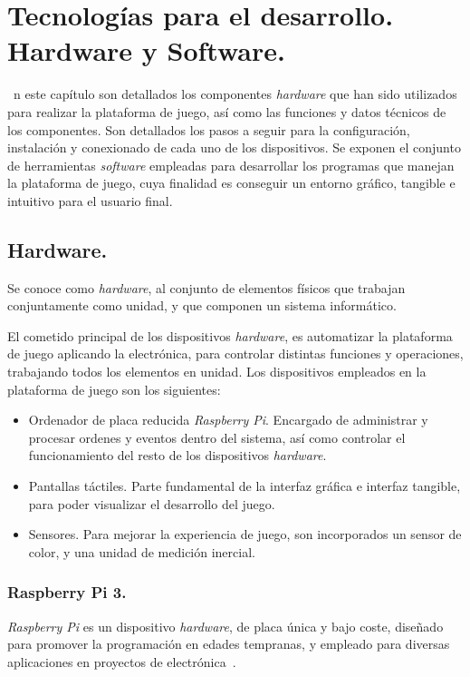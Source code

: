 \chapter{Tecnologías para el desarrollo. Hardware y Software.}
\label{chap:tecnologias}

\noindent
{}~n este capítulo son detallados los componentes \emph{hardware} que han sido utilizados para realizar la plataforma de juego, así como las funciones y datos técnicos de los componentes. Son detallados los pasos a seguir para la configuración, instalación y conexionado de cada uno de los dispositivos. Se exponen el conjunto de herramientas \emph{software} empleadas para desarrollar los programas que manejan la plataforma de juego, cuya finalidad es conseguir un entorno gráfico, tangible e intuitivo para el usuario final.


\section{Hardware.}
\label{sec:hardware}
Se conoce como \emph{hardware}, al conjunto de elementos físicos que trabajan conjuntamente como unidad, y que componen un sistema informático.

El cometido principal de los dispositivos \emph{hardware}, es automatizar la plataforma de juego aplicando la electrónica, para controlar distintas funciones y operaciones, trabajando todos los elementos en unidad.
Los dispositivos empleados en la plataforma de juego son los siguientes:
\begin{itemize}
\item Ordenador de placa reducida \emph{Raspberry Pi}. Encargado de administrar y procesar ordenes y eventos dentro del sistema, así como controlar el funcionamiento del resto de los dispositivos \emph{hardware}.
\item Pantallas táctiles. Parte fundamental de la interfaz gráfica e interfaz tangible, para poder visualizar el desarrollo del juego.
\item Sensores. Para mejorar la experiencia de juego, son incorporados un sensor de color, y una unidad de medición inercial.
\end{itemize}

\subsection{Raspberry Pi 3.}
\label{subsubs:rasp}
\emph{Raspberry Pi} es un dispositivo \emph{hardware}, de placa única y bajo coste, diseñado para promover la programación en edades tempranas, y empleado para diversas aplicaciones en proyectos de electrónica~\cite{Upton}.\


